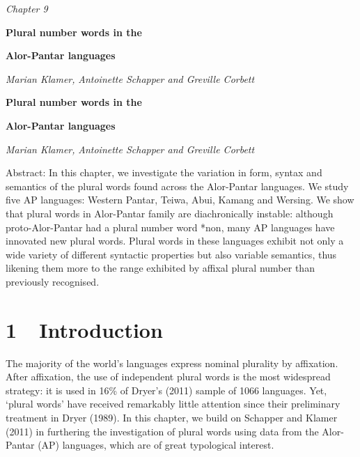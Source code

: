 
\clearpage\setcounter{page}{1}\pagestyle{Standard}
{\centering\itshape
Chapter 9
\par}

{\centering\bfseries
Plural number words in the 
\par}

{\centering\bfseries
Alor-Pantar languages
\par}

{\centering
\textit{Marian Klamer}\textit{, }\textit{Antoinette Schapper and Greville Corbett}
\par}


{\centering\bfseries
Plural number words in the 
\par}

{\centering\bfseries
Alor-Pantar languages
\par}

{\centering
\textit{Marian Klamer}\textit{, }\textit{Antoinette Schapper and Greville Corbett}
\par}

Abstract: In this chapter, we investigate the variation in form, syntax and semantics of the plural words found across the Alor-Pantar languages. We study five AP languages: Western Pantar, Teiwa, Abui, Kamang and Wersing. We show that plural words in Alor-Pantar family are diachronically instable: although proto-Alor-Pantar had a plural number word *non, many AP languages have innovated new plural words. Plural words in these languages exhibit not only a wide variety of different syntactic properties but also variable semantics, thus likening them more to the range exhibited by affixal plural number than previously recognised.

\section[1\ \ Introduction]{1\ \ Introduction\footnotemark{}}
\hypertarget{Toc376962648}{}
The majority of the world{\textquoteright}s languages express nominal plurality by affixation. After affixation, the use of independent plural words is the most widespread strategy: it is used in 16\% of Dryer{\textquoteright}s (2011) sample of 1066 languages. Yet, {\textquoteleft}plural words{\textquoteright} have received remarkably little attention since their preliminary treatment in Dryer (1989). In this chapter, we build on Schapper and Klamer (2011) in furthering the investigation of plural words using data from the Alor-Pantar (AP) languages, which are of great typological interest. 

